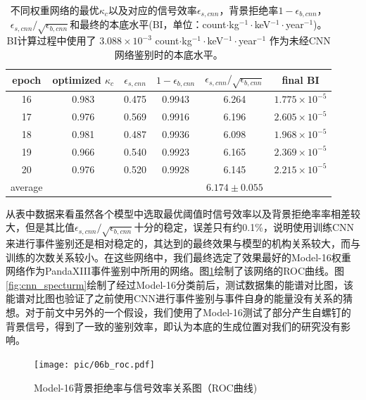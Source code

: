 \begin{table}
    \centering
    \begin{tabular}{cccccc}
      \\\hline
      epoch & optimized $\kappa_c$ & $\epsilon_{s,cnn}$ & $ 1-\epsilon_{b,cnn}$ &$\epsilon_{s,cnn}/\sqrt{\epsilon_{b,cnn}}$ & final BI\\\hline
      16 & 0.983 & 0.475 & 0.9943 & 6.264 & $1.775\times10^{-5}$ \\
      17 & 0.976 & 0.569 & 0.9916 & 6.196 & $2.605\times10^{-5}$ \\
      18 & 0.981 & 0.487 & 0.9936 & 6.098 & $1.968\times10^{-5}$ \\
      19 & 0.966 & 0.540 & 0.9923 & 6.165 & $2.369\times10^{-5}$ \\
      20 & 0.976 & 0.520 & 0.9928 & 6.145 & $2.215\times10^{-5}$ \\\hline
      average &  &  &  & $6.174\pm0.055$ \\\hline
    \end{tabular}
    \caption{不同权重网络的最优$\kappa_c$以及对应的信号效率$\epsilon_{s,cnn}$，背景拒绝率$1-\epsilon_{b,cnn}$，$\epsilon_{s,cnn}/\sqrt{\epsilon_{b,cnn}}$和最终的本底水平(BI，单位：count$\cdot$kg$^{-1}\cdot$keV$^{-1}\cdot$year$^{-1}$)。BI计算过程中使用了 $3.088\times10^{-3}$ count$\cdot$kg$^{-1}\cdot$keV$^{-1}\cdot$year$^{-1}$ 作为未经CNN网络鉴别时的本底水平。}
    \label{tab:efficiencies}
  \end{table}
  
从表中数据来看虽然各个模型中选取最优阈值时信号效率以及背景拒绝率率相差较大，但是其比值$\epsilon_{s,cnn}/\sqrt{\epsilon_{b,cnn}}$十分的稳定，误差只有约0.1\%，说明使用训练CNN来进行事件鉴别还是相对稳定的，其达到的最终效果与模型的机构关系较大，而与训练的次数关系较小。在这些网络中，我们最终选定了效果最好的Model-16权重网络作为PandaXIII事件鉴别中所用的网络。图\ref{fig:cnn_roc}绘制了该网络的ROC曲线。图\ref{fig:cnn_specturm}绘制了经过Model-16分类前后，测试数据集的能谱对比图，该能谱对比图也验证了之前使用CNN进行事件鉴别与事件自身的能量没有关系的猜想。对于前文中另外的一个假设，我们使用了Model-16测试了部分产生自螺钉的背景信号，得到了一致的鉴别效率，即认为本底的生成位置对我们的研究没有影响。

\begin{figure}
    \centering
    \texttt{[image: pic/06b\_roc.pdf]}
    \caption{Model-16背景拒绝率与信号效率关系图（ROC曲线)}
    \label{fig:cnn_roc}
\end{figure}

